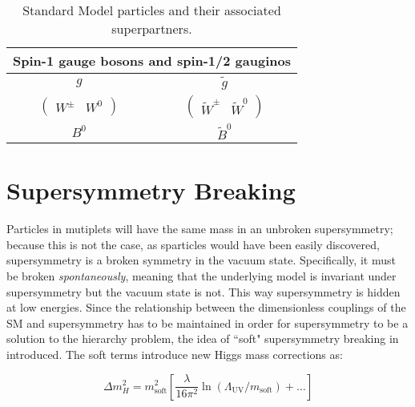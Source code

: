 \begin{table}[!htb]
\begin{tabular}{c|c}
		\hline\hline
		\multicolumn{5}{c}{Spin-1 gauge bosons and spin-1/2 gauginos} \\
		\hline
		$g$											& $\tilde{g}$											\\%
		$\begin{pmatrix} W^{\pm}&W^0\end{pmatrix}$	& $\begin{pmatrix} \widetilde{W}^{\pm}&\widetilde{W}^0\end{pmatrix}$						\\%
		$B^0$											& $\widetilde{B}^0$												\\%
		\hline\hline
	\end{tabular}
	\caption{Standard Model particles and their associated superpartners.}
	\label{tab:smsusypartners}
\end{table}


\section{Supersymmetry Breaking}

Particles in mutiplets will have the same mass in an unbroken supersymmetry; because this is not the case, as sparticles would have been easily discovered, supersymmetry is a broken symmetry in the vacuum state.  Specifically, it must be broken \textit{spontaneously}, meaning that the underlying model is invariant under supersymmetry but the vacuum state is not.  This way supersymmetry is hidden at low energies.  Since the relationship between the dimensionless couplings of the SM and supersymmetry has to be maintained in order for supersymmetry to be a solution to the hierarchy problem, the idea of ``soft" supersymmetry breaking in introduced.  The soft terms introduce new Higgs mass corrections as\cite{susyprimer}:



\begin{equation}
	\Delta m_H^2 = m_{\mathrm{soft}}^2 \left[ \frac{\lambda}{16\pi^2}\ln(\Lambda_{\mathrm{UV}}/m_{\mathrm{soft}})+\dots \right]
\end{equation}

